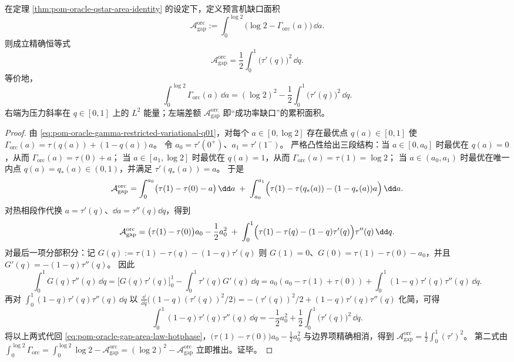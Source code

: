 \begin{theorem}\label{thm:pom-oracle-gap-area-law-energy}
在定理 \ref{thm:pom-oracle-qstar-area-identity} 的设定下，定义预言机缺口面积
\[
\mathcal{A}^{\mathrm{orc}}_{\mathrm{gap}}
:=\int_{0}^{\log 2}\bigl(\log 2-\Gamma_{\mathrm{orc}}(a)\bigr)\,\dd a.
\]
则成立精确恒等式
\[
\boxed{\;
\mathcal{A}^{\mathrm{orc}}_{\mathrm{gap}}
=\frac12\int_{0}^{1}\bigl(\tau'(q)\bigr)^2\,\dd q.\;}
\]
等价地，
\[
\boxed{\;
\int_{0}^{\log 2}\Gamma_{\mathrm{orc}}(a)\,\dd a
=(\log 2)^2-\frac12\int_{0}^{1}\bigl(\tau'(q)\bigr)^2\,\dd q.\;}
\]
右端为压力斜率在 \(q\in[0,1]\) 上的 \(L^2\) 能量；左端差额 \(\mathcal{A}^{\mathrm{orc}}_{\mathrm{gap}}\) 即“成功率缺口”的累积面积。
\end{theorem}
\begin{proof}
由 \eqref{eq:pom-oracle-gamma-restricted-variational-q01}，对每个 \(a\in[0,\log 2]\) 存在最优点 \(q(a)\in[0,1]\) 使
\(
\Gamma_{\mathrm{orc}}(a)=\tau(q(a))+(1-q(a))a
\)。
令 \(a_0=\tau'(0^+)\)、\(a_1=\tau'(1^-)\)。
严格凸性给出三段结构：当 \(a\in[0,a_0]\) 时最优在 \(q(a)=0\)，从而 \(\Gamma_{\mathrm{orc}}(a)=\tau(0)+a\)；
当 \(a\in[a_1,\log 2]\) 时最优在 \(q(a)=1\)，从而 \(\Gamma_{\mathrm{orc}}(a)=\tau(1)=\log 2\)；
当 \(a\in(a_0,a_1)\) 时最优在唯一内点 \(q(a)=q_*(a)\in(0,1)\)，并满足 \(\tau'(q_*(a))=a\)。
于是
\[
\mathcal{A}^{\mathrm{orc}}_{\mathrm{gap}}
=\int_{0}^{a_0}\bigl(\tau(1)-\tau(0)-a\bigr)\,\dd a
\;+\;
\int_{a_0}^{a_1}\Bigl(\tau(1)-\tau(q_*(a))-(1-q_*(a))a\Bigr)\,\dd a.
\]
对热相段作代换 \(a=\tau'(q)\)、\(\dd a=\tau''(q)\dd q\)，得到
\begin{equation}\label{eq:pom-oracle-gap-area-law-hotphase}
\mathcal{A}^{\mathrm{orc}}_{\mathrm{gap}}
=\bigl(\tau(1)-\tau(0)\bigr)a_0-\frac12a_0^2
\;+\;
\int_{0}^{1}\Bigl(\tau(1)-\tau(q)-(1-q)\tau'(q)\Bigr)\tau''(q)\,\dd q.
\end{equation}
对最后一项分部积分：记
\(
G(q):=\tau(1)-\tau(q)-(1-q)\tau'(q)
\)
则 \(G(1)=0\)、\(G(0)=\tau(1)-\tau(0)-a_0\)，并且 \(G'(q)=-(1-q)\tau''(q)\)。
因此
\[
\int_{0}^{1}G(q)\tau''(q)\,\dd q
=\bigl[G(q)\tau'(q)\bigr]_{0}^{1}-\int_{0}^{1}\tau'(q)G'(q)\,\dd q
=a_0(a_0-\tau(1)+\tau(0))+\int_{0}^{1}(1-q)\tau'(q)\tau''(q)\,\dd q.
\]
再对 \(\int_{0}^{1}(1-q)\tau'(q)\tau''(q)\,\dd q\) 以
\(
\frac{\dd}{\dd q}\bigl((1-q)(\tau'(q))^2/2\bigr)=-(\tau'(q))^2/2+(1-q)\tau'(q)\tau''(q)
\)
化简，可得
\[
\int_{0}^{1}(1-q)\tau'(q)\tau''(q)\,\dd q
=-\frac12a_0^2+\frac12\int_{0}^{1}\bigl(\tau'(q)\bigr)^2\,\dd q.
\]
将以上两式代回 \eqref{eq:pom-oracle-gap-area-law-hotphase}，\(\bigl(\tau(1)-\tau(0)\bigr)a_0-\frac12a_0^2\) 与边界项精确相消，得到
\(
\mathcal{A}^{\mathrm{orc}}_{\mathrm{gap}}=\frac12\int_{0}^{1}(\tau')^2
\)。
第二式由
\(
\int_0^{\log 2}\Gamma_{\mathrm{orc}}=\int_0^{\log 2}\log 2-\mathcal{A}^{\mathrm{orc}}_{\mathrm{gap}}
=(\log 2)^2-\mathcal{A}^{\mathrm{orc}}_{\mathrm{gap}}
\)
立即推出。证毕。
\end{proof}

